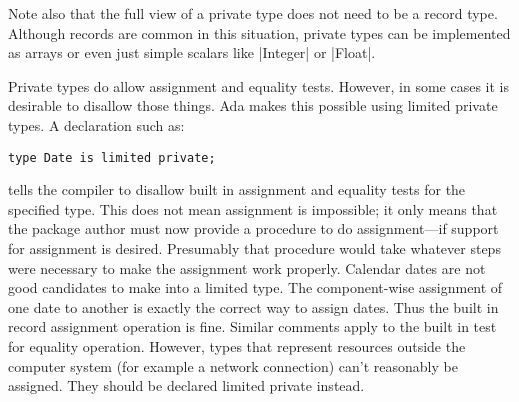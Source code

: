 Note also that the full view of a private type does not need to be a record type. Although
records are common in this situation, private types can be implemented as arrays or even just
simple scalars like |Integer| or |Float|.

Private types do allow assignment and equality tests. However, in some cases it is desirable to
disallow those things. Ada makes this possible using limited private types. A declaration such
as:

\begin{lstlisting}
type Date is limited private;
\end{lstlisting}

\noindent tells the compiler to disallow built in assignment and equality tests for the
specified type. This does not mean assignment is impossible; it only means that the package
author must now provide a procedure to do assignment---if support for assignment is desired.
Presumably that procedure would take whatever steps were necessary to make the assignment work
properly. Calendar dates are not good candidates to make into a limited type. The component-wise
assignment of one date to another is exactly the correct way to assign dates. Thus the built in
record assignment operation is fine. Similar comments apply to the built in test for equality
operation. However, types that represent resources outside the computer system (for example a
network connection) can't reasonably be assigned. They should be declared limited private
instead.

